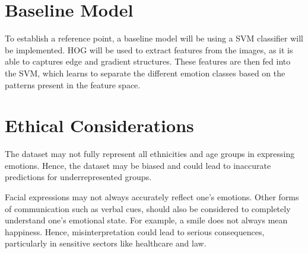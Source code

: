 \documentclass[final]{article}
\begin{document}
\section*{Baseline Model}
To establish a reference point, a baseline model will be using a SVM classifier will be implemented. HOG will be used to extract features from the images, as it is able to captures edge and gradient structures. These features are then fed into the SVM, which learns to separate the different emotion classes based on the patterns present in the feature space.

\section*{Ethical Considerations}
The dataset may not fully represent all ethnicities and age groups in expressing emotions. Hence, the dataset may be biased and could lead to inaccurate predictions for underrepresented groups.

Facial expressions may not always accurately reflect one's emotions. Other forms of communication such as verbal cues,  should also be considered to completely understand one's emotional state. For example, a smile does not always mean happiness. Hence, misinterpretation could lead to serious consequences, particularly in sensitive sectors like healthcare and law.


\newpage
 

\end{document}
